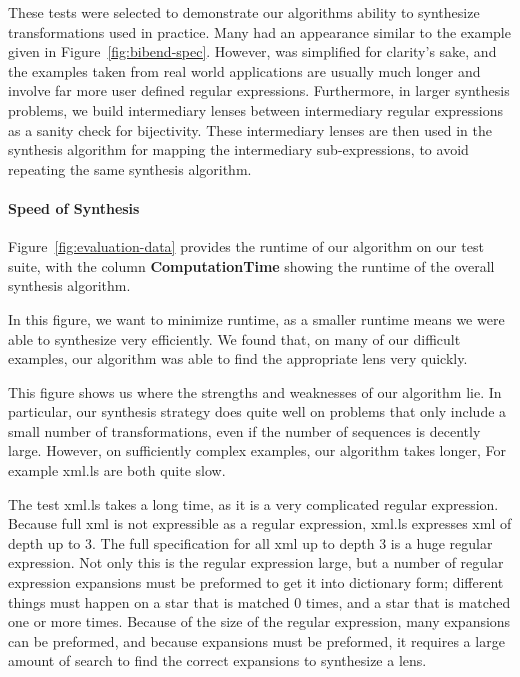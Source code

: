 \documentclass[numbers,10pt,preprint\ifanon ,nocopyrightspace\fi]{sigplanconf}
\begin{document}
These tests were selected to demonstrate our algorithms ability to synthesize
transformations used in practice.  Many had an appearance similar to the
 example given in Figure~\ref{fig:bibend-spec}.  However, 
was simplified for clarity's sake, and the examples taken from real world
applications are usually much longer and involve far more user defined regular
expressions.  Furthermore, in larger synthesis problems,
we build intermediary lenses
between intermediary regular expressions as a sanity check for bijectivity.
These intermediary lenses are then used in the synthesis algorithm for mapping
the intermediary sub-expressions, to avoid repeating the same synthesis
algorithm.

\paragraph*{Speed of Synthesis}
%
Figure~\ref{fig:evaluation-data} provides the runtime of our algorithm on our
test suite, with the column \textbf{ComputationTime} showing the runtime of the
overall synthesis algorithm.

In this figure, we want to minimize runtime, as a smaller runtime means we were
able to synthesize very efficiently.
We found that, on many of our difficult examples, our algorithm was able to find
the appropriate lens very quickly.

This figure shows us where the strengths and weaknesses of our algorithm lie.
In particular, our synthesis strategy does quite well on problems that only
include a small number of transformations, even if the number of sequences is
decently large.
However, on sufficiently complex examples, our algorithm takes longer,
For example xml.ls are both quite slow.

The test xml.ls takes a long time, as it is a very complicated regular
expression.  Because full xml is not expressible as a regular expression, xml.ls
expresses xml of depth up to 3.  The full specification for all xml up to depth
3 is a huge regular expression.  Not only
this is the regular expression large,
but a number of regular expression expansions must be preformed to get it
into dictionary form; different things must happen on a star that is matched
0 times, and a star that is matched one or more times.  Because of the size of
the regular expression, many expansions can be preformed, and because expansions
must be preformed, it requires a large amount of search to find the correct
expansions to synthesize a lens.
\end{document}

